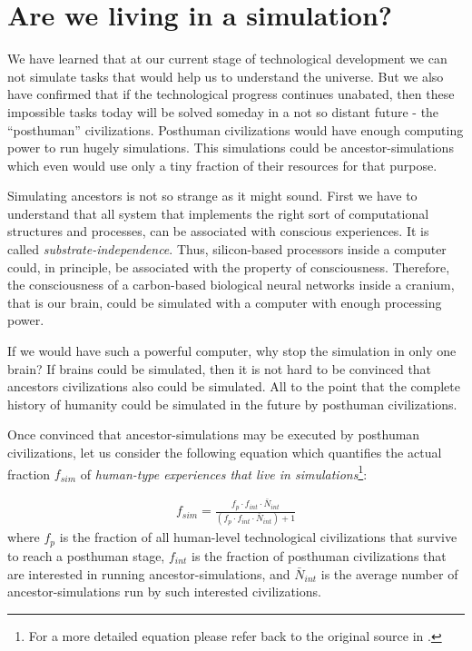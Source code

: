 \documentclass[twoside,11pt]{article}
\begin{document}
\section{Are we living in a simulation?}
\label{sec:sim}

We have learned that at our current stage of technological development we can not simulate tasks that would help us to understand the universe.
But we also have confirmed that if the technological progress continues unabated, then these impossible tasks today will be solved someday in a not so distant future - the ``posthuman'' civilizations.
Posthuman civilizations would have enough computing power to run hugely simulations.
This simulations could be ancestor-simulations which even would use only a tiny fraction of their resources for that purpose.

Simulating ancestors is not so strange as it might sound.
First we have to understand that all system that implements the right sort of computational structures and processes, can be associated with conscious experiences.
It is called \emph{substrate-independence}.
Thus, silicon-based processors inside a computer could, in principle, be associated with the property of consciousness.
Therefore, the consciousness of a carbon-based biological neural networks inside a cranium, that is our brain, could be simulated with a computer with enough processing power.

If we would have such a powerful computer, why stop the simulation in only one brain?
If brains could be simulated, then it is not hard to be convinced that ancestors civilizations also could be simulated.
All to the point that the complete history of humanity could be simulated in the future by posthuman civilizations.

Once convinced that ancestor-simulations may be executed by posthuman civilizations, let us consider the following equation which quantifies the actual fraction $f_{sim}$ of \emph{human-type experiences that live in simulations}\footnote{For a more detailed equation please refer back to the original source in \citep{bostrom2003we}.}:

\begin{eqnarray*}
	f_{sim} = \frac{f_p \cdot f_{int} \cdot \bar{N}_{int}}{(f_p \cdot f_{int} \cdot \bar{N}_{int}) + 1}
\end{eqnarray*}
where 
$f_p$ is the fraction of all human-level technological civilizations that survive to reach a posthuman stage,
$f_{int}$ is the fraction of posthuman civilizations that are interested in running ancestor-simulations, and
$\bar{N}_{int}$ is the average number of ancestor-simulations run by such interested civilizations.
\end{document}
